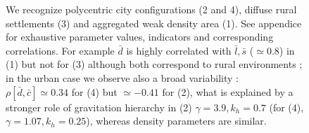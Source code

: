 \documentclass{bmcart}
\begin{document}
\begin{figure}[h!]
	\caption{ We recognize polycentric city configurations (2 and 4), diffuse rural settlements (3) and aggregated weak density area (1). See appendice for exhaustive parameter values, indicators and corresponding correlations. For example $\bar{d}$ is highly correlated with $\bar{l},\bar{s}$ ($\simeq$0.8) in (1) but not for (3) although both correspond to rural environments ; in the urban case we observe also a broad variability : $\rho[\bar{d},\bar{c}]\simeq 0.34$ for (4) but $\simeq-0.41$ for (2), what is explained by a stronger role of gravitation hierarchy in (2) $\gamma=3.9,k_h=0.7$ (for (4), $\gamma=1.07,k_h=0.25$), whereas density parameters are similar.\label{fig:configexamples}}
\end{figure}
\end{document}
